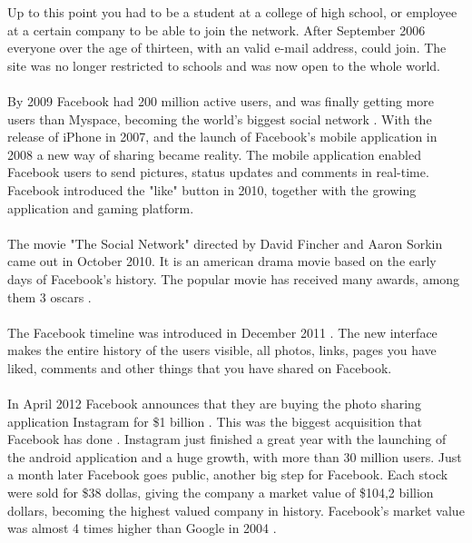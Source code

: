 Up to this point you had to be a student at a college of high school, or employee at a certain company to be able to join the network. After September 2006 everyone over the age of thirteen, with an valid e-mail address, could join. The site was no longer restricted to schools and was now open to the whole world. 

\paragraph{}
By 2009 Facebook had 200 million active users, and was finally getting more users than Myspace, becoming the world's biggest social network \cite{FacebookStoryInceptionToIsp}. With the release of iPhone in 2007, and the launch of Facebook's mobile application in 2008 a new way of sharing became reality. The mobile application enabled Facebook users to send pictures, status updates and comments in real-time. Facebook introduced the "like" button in 2010, together with the growing application and gaming platform. 

\paragraph{}
The movie "The Social Network" directed by David Fincher and Aaron Sorkin came out in October 2010. It is an american drama movie based on the early days of Facebook's history. The popular movie has received many awards, among them 3 oscars \cite{TheSocialNetwork}. 

\paragraph{}
The Facebook timeline was introduced in December 2011 \cite{EvolutionOfFacebook}. The new interface makes the entire history of the users visible, all photos, links, pages you have liked, comments and other things that you have shared on Facebook. 

\paragraph{}
In April 2012 Facebook announces that they are buying the photo sharing application Instagram for \$1 billion . This was the biggest acquisition that Facebook has done \cite{FacebookInstragram}. Instagram just finished a great year with the launching of the android application and a huge growth, with more than 30 million users. 
Just a month later Facebook goes public, another big step for Facebook. Each stock were sold for \$38 dollas, giving the company a market value of \$104,2 billion dollars, becoming the highest valued company in history. Facebook's market value was almost 4 times higher than Google in 2004 \cite{EvolutionOfFacebook}. 
  

